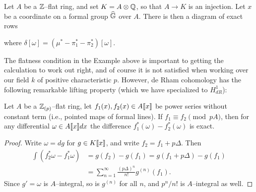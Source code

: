 \begin{example}
Let $A$ be a $\mathbb Z$--flat ring, and set $K = A \otimes \mathbb{Q}$, so that $A \to K$ is an injection.  Let $x$ be a coordinate on a formal group $\widehat{\mathbb G}$ over $A$.  There is then a diagram of exact rows
\begin{center}
\end{center}
where $\delta[\omega] = (\mu^* - \pi_1^* - \pi_2^*)[\omega]$.
\end{example}



The flatness condition in the Example above is important to getting the calculation to work out right, and of course it is not satisfied when working over our field $k$ of positive characteristic $p$.  However, de Rham cohomology has the following remarkable lifting property (which we have specialized to $H^1_{dR}$):

\begin{theorem}
Let $A$ be a $\mathbb Z_{(p)}$--flat ring, let $f_1(x), f_2(x) \in A\llbracket{x}\rrbracket$ be power series without constant term (i.e., pointed maps of formal lines).  If $f_1 \equiv f_2 \pmod{pA}$, then for any differential $\omega \in A\llbracket{x}\rrbracket dx$ the difference $f_1^*(\omega) - f_2^*(\omega)$ is exact.
\end{theorem}
\begin{proof}
Write $\omega = dg$ for $g \in K\llbracket{x}\rrbracket$, and write $f_2 = f_1 + p\Delta$.  Then
\begin{align*}
\int \left( f_2^* \omega - f_1^* \omega \right) & = g(f_2) - g(f_1) = g(f_1 + p\Delta) - g(f_1) \\
& = \sum_{n = 1}^\infty \frac{(p\Delta)^n}{n!} g^{(n)}(f_1).
\end{align*}
Since $g' = \omega$ is $A$--integral, so is $g^{(n)}$ for all $n$, and $p^n/n!$ is $A$--integral as well.
\end{proof}

